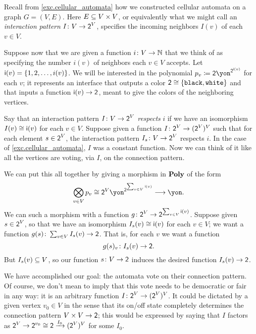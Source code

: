 \documentclass[Book-Poly]{subfiles}
\begin{document}
\begin{example}\label{ex.cell_auto_vote_interaction}
Recall from \cref{exc.cellular_automata} how we constructed cellular automata on a graph $G=(V,E)$. Here $E\ss V\times V$, or equivalently what we might call an \emph{interaction pattern} $I\colon V\to \2^V$, specifies the incoming neighbors $I(v)$ of each $v\in V$.

Suppose now that we are given a function $i\colon V\to\nn$ that we think of as specifying the number $i(v)$ of neighbors each $v\in V$ accepts. Let $\ord{i}(v)=\{1,2,\ldots, i(v)\}$. We will be interested in the polynomial $p_v\coloneqq\2\yon^{\2^{\ord{i}(v)}}$ for each $v$; it represents an interface that outputs a color $\2\cong\{\const{black},\const{white}\}$ and that inputs a function $\ord{i}(v)\to\2$, meant to give the colors of the neighboring vertices.

Say that an interaction pattern $I\colon V\to\2^V$ \emph{respects} $i$ if we have an isomorphism $I(v)\cong\ord{i}(v)$ for each $v\in V$. Suppose given a function $I\colon \2^V\to (\2^V)^V$ such that for each element $s\in\2^V$, the interaction pattern $I_s\colon V\to \2^V$ respects $i$. In the case of \cref{exc.cellular_automata}, $I$ was a constant function. Now we can think of it like all the vertices are voting, via $I$, on the connection pattern. 

We can put this all together by giving a morphism in $\poly$ of the form
\begin{equation}\label{eqn.polymap_misc9237}
\bigotimes_{v\in V}p_v\cong\2^V\yon^{\2^{\sum_{v\in V}\ord{i}(v)}}\too\yon.
\end{equation}
We can such a morphism with a function $g\colon \2^V\to\2^{\sum_{v\in V}\ord{i}(v)}$. Suppose given $s\in\2^V$, so that we have an isomorphism $I_s(v)\cong\ord{i}(v)$ for each $v\in V$; we want a function $g(s)\colon\sum_{v\in V}I_s(v)\to\2$. That is, for each $v$ we want a function
\[
g(s)_v\colon I_s(v)\to\2.
\]
But $I_s(v)\ss V$, so our function $s\colon V\to\2$ induces the desired function $I_s(v)\to\2$.

We have accomplished our goal: the automata vote on their connection pattern. Of course, we don't mean to imply that this vote needs to be democratic or fair in any way: it is an arbitrary function $I\colon \2^V\to(\2^V)^V$. It could be dictated by a given vertex $v_0\in V$ in the sense that its on/off state completely determines the connection pattern $V\times V\to \2$; this would be expressed by saying that $I$ factors as $\2^V\to\2^{v_0}\cong\2\To{I_0}(\2^V)^V$ for some $I_0$.
\end{example}
\end{document}
